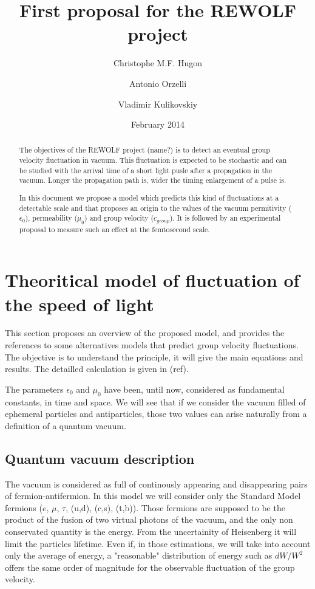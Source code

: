 \documentclass[9pt, a4, twoside]{article}
\title{First proposal for the REWOLF project}
\author[1]{Christophe M.F. Hugon}
\author[1]{Antonio Orzelli}
\author[1]{Vladimir Kulikovskiy}
\affil[1]{INFN, Sezione di Genova}
\date{February 2014}
\begin{document}
 
\maketitle
\begin{abstract}
The objectives of the REWOLF project (name?) is to detect an eventual group velocity fluctuation in vacuum. This fluctuation is expected to be stochastic and can be studied with the arrival time of a short light pusle after a propagation in the vacuum. Longer the propagation path is, wider the timing enlargement of a pulse is.

In this document we propose a model which predicts this kind of fluctuations at a detectable scale and that proposes an origin to the values of the vacuum permitivity ($\epsilon_0$), permeability ($\mu_0$) and group velocity ($c_{group}$). It is followed by an experimental proposal to measure such an effect at the femtosecond scale.
\end{abstract}

 \section {Theoritical model of fluctuation of the speed of light}
This section proposes an overview of the proposed model, and provides the references to some alternatives models that predict group velocity fluctuations. The objective is to understand the principle, it will give the main equations and results. The detailled calculation is given in (ref).

The parameters $\epsilon_0$ and $\mu_0$ have been, until now, considered as fundamental constants, in time and space. We will see that if we consider the vacuum filled of ephemeral particles and antiparticles, those two values can arise naturally from a definition of a quantum vacuum.

\subsection {Quantum vacuum description}

The vacuum is considered as full of continously appearing and disappearing pairs of fermion-antifermion. In this model we will consider only the Standard Model fermions ($e$, $\mu$, $\tau$, (u,d), (c,s), (t,b)). Those fermions are supposed to be the product of the fusion of two virtual photons of the vacuum, and the only non conservated quantity is the energy. From the uncertainity of Heisenberg it will limit the particles lifetime. Even if, in those estimations, we will take into account only the average of energy, a "reasonable" distribution of energy such as $dW/W^2$ offers the same order of magnitude for the observable fluctuation of the group velocity.
\end{document}
